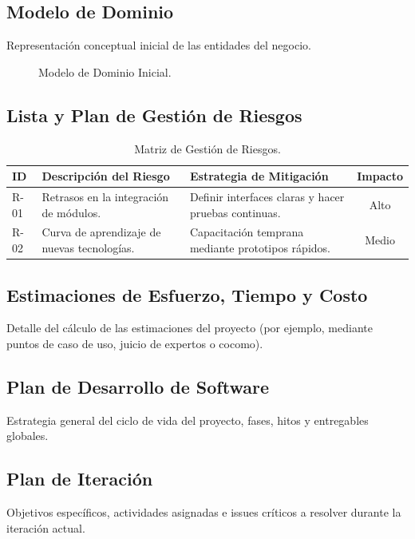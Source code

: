 \documentclass[12pt,letterpaper]{article}
\begin{document}
\subsection{Modelo de Dominio}
Representación conceptual inicial de las entidades del negocio.
\begin{figure}[H]
    \centering
    \caption{Modelo de Dominio Inicial.}
    \label{fig:dominio_inicio}
\end{figure}

\subsection{Lista y Plan de Gestión de Riesgos}
\begin{table}[H]
\centering
\small
\begin{tabularx}{\textwidth}{lXXc}
\toprule
\textbf{ID} & \textbf{Descripción del Riesgo} & \textbf{Estrategia de Mitigación} & \textbf{Impacto} \\
\midrule
R-01 & Retrasos en la integración de módulos. & Definir interfaces claras y hacer pruebas continuas. & Alto \\
R-02 & Curva de aprendizaje de nuevas tecnologías. & Capacitación temprana mediante prototipos rápidos. & Medio \\
\bottomrule
\end{tabularx}
\caption{Matriz de Gestión de Riesgos.}
\end{table}

\subsection{Estimaciones de Esfuerzo, Tiempo y Costo}
Detalle del cálculo de las estimaciones del proyecto (por ejemplo, mediante puntos de caso de uso, juicio de expertos o cocomo).

\subsection{Plan de Desarrollo de Software}
Estrategia general del ciclo de vida del proyecto, fases, hitos y entregables globales.

\subsection{Plan de Iteración}
Objetivos específicos, actividades asignadas e issues críticos a resolver durante la iteración actual.
\end{document}
